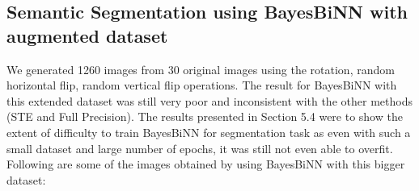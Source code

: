 \subsection*{Semantic Segmentation using BayesBiNN with augmented dataset}

 We generated 1260 images from 30 original images using the rotation, random horizontal flip, random vertical flip operations. The result for BayesBiNN with this extended dataset was still very poor and inconsistent with the other methods (STE and Full Precision). The results presented in Section 5.4 were to show the extent of difficulty to train BayesBiNN for segmentation task as even with such a small dataset and large number of epochs, it was still not even able to overfit. Following are some of the images obtained by using BayesBiNN with this bigger dataset:
 
